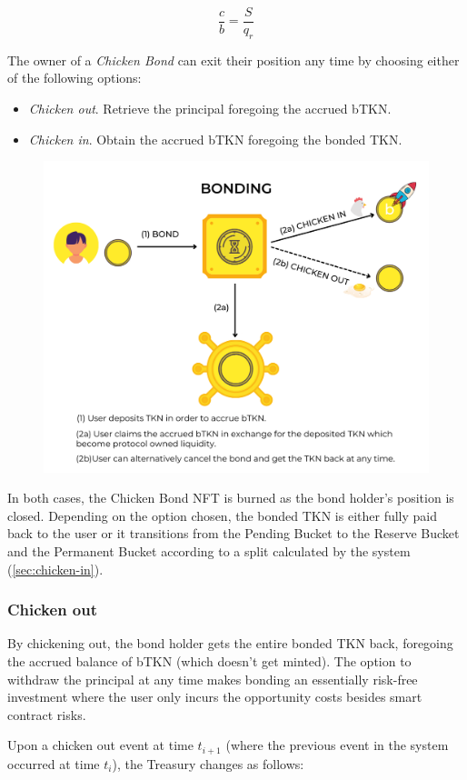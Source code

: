 \documentclass{article}
\begin{document}
\begin{equation}
  \label{eq:cap-bond-ratio}
    \frac{c}{b} = \frac{S}{q_r}
\end{equation}   

The owner of a \textit{Chicken Bond} can exit their position any time by choosing either of the following options:

\begin{itemize}
    \item \textit{Chicken out}. Retrieve the principal foregoing the accrued bTKN.
    \item \textit{Chicken in}. Obtain the accrued bTKN foregoing the bonded TKN.
\end{itemize}

\begin{figure}[ht]
    \centering
    \includegraphics[width=0.5\linewidth]{./bonding_text.png}
\end{figure}

In both cases, the Chicken Bond NFT is burned as the bond holder’s position is closed. Depending on the option chosen, the bonded TKN is either fully paid back to the user or it transitions from the Pending Bucket to the Reserve Bucket and the Permanent Bucket according to a split calculated by the system (\ref{sec:chicken-in}). 

\subsubsection{Chicken out}
\label{sec:chicken-out}
By chickening out, the bond holder gets the entire bonded TKN back, foregoing the accrued balance of bTKN (which doesn’t get minted). The option to withdraw the principal at any time makes bonding an essentially risk-free investment where the user only incurs the opportunity costs besides smart contract risks.

Upon a chicken out event at time $t_{i+1}$ (where the previous event in the system occurred at time $t_i$), the Treasury changes as follows:
\end{document}
